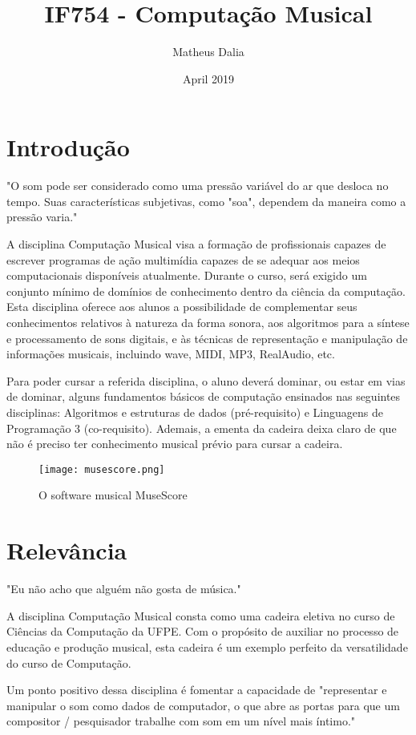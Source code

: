 \documentclass{article}
\title{IF754 - Computação Musical}
\author{Matheus Dalia}
\date{April 2019}
\begin{document}
\maketitle

\section{Introdução}
"O som pode ser considerado como uma pressão variável do ar que desloca no tempo. Suas características subjetivas, como "soa", dependem da maneira como a pressão varia." \cite{techMIT}

A disciplina Computação Musical visa a formação de profissionais capazes de escrever programas de ação multimídia capazes de se adequar aos meios computacionais disponíveis atualmente. Durante o curso, será exigido um conjunto mínimo de domínios de conhecimento dentro da ciência da computação. Esta disciplina oferece aos alunos a possibilidade de complementar seus conhecimentos relativos à natureza da forma sonora, aos algoritmos para a síntese e processamento de sons digitais, e às técnicas de representação e manipulação de informações  musicais, incluindo wave, MIDI, MP3, RealAudio, etc.

Para poder cursar a referida disciplina, o aluno deverá dominar, ou estar em vias de dominar, alguns fundamentos básicos de computação ensinados nas seguintes disciplinas: Algoritmos e estruturas de dados (pré-requisito) e Linguagens de Programação 3 (co-requisito). Ademais, a ementa da cadeira deixa claro de que não é preciso ter conhecimento musical prévio para cursar a cadeira.

\begin{figure}[h!]
\centering
\texttt{[image: musescore.png]}
\caption{O software musical MuseScore}
\label{fig:Peixe}
\end{figure}

\section{Relevância}
"Eu não acho que alguém não gosta de música."\cite{science}

A disciplina Computação Musical consta como uma cadeira eletiva no curso de Ciências da Computação da UFPE. Com o propósito de auxiliar no processo de educação e produção musical, esta cadeira é um exemplo perfeito da versatilidade do curso de Computação.

Um ponto positivo dessa disciplina é fomentar a capacidade de "representar e manipular o som como dados de computador, o que abre as portas para que um compositor / pesquisador trabalhe com som em um nível mais íntimo."\cite{represent}
\end{document}
